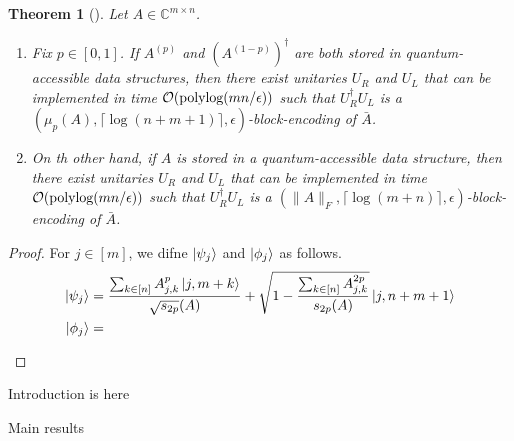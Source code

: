 \documentclass[10pt,twoside,reqno]{amsart} %
\makeatletter
\renewcommand{\section}{\@startsection{section}{1}
   \z@{.7\linespacing\@plus\linespacing}{.5\linespacing}
   {\normalfont\upshape\bfseries\centering}}
\theoremstyle{plain}
\newtheorem{thm}{Theorem}[section]
\theoremstyle{definition}
\makeatother
\begin{document}
\begin{thm}[\cite{chakraborty2019}]
  Let $A\in\mathbb{C}^{m\times n}$.
  \begin{enumerate}
    \item Fix $p\in [0,1]$. If $A^{(p)}$ and $(A^{(1-p)})^{\dagger}$ are both
      stored in quantum-accessible data structures, then there exist
      unitaries $U_R$ and $U_L$ that can be implemented in time
      $\mathcal{O}(\textrm{\normalfont polylog}(mn/\epsilon))$ such that
      $U_R^{\dagger}U_L$ is a $(\mu_p(A), \lceil\log(n+m+1)\rceil, 
      \epsilon)$-block-encoding of $\bar{A}$.
    \item On th other hand, if $A$ is stored in a quantum-accessible data
      structure, then there exist unitaries $U_R$ and $U_L$ that can
      be implemented in time $\mathcal{O}(\textrm{\normalfont polylog}(mn/\epsilon))$ such
      that $U_R^{\dagger}U_L$ is a $(\|A\|_F, \lceil\log(m+n)\rceil,
      \epsilon)$-block-encoding of $\bar{A}$.
  \end{enumerate}
\end{thm}
\begin{proof}
  For $j\in[m]$, we difne $\ket{\psi_j}$ and $\ket{\phi_j}$ as follows.
  \begin{align*}
    \ket{\psi_j} &= \frac{\sum_{k\in[n]}A^p_{j,k}\ket{j,m+k}}{\sqrt{s_{2p}}(A)}+
    \sqrt{1-\frac{\sum_{k\in[n]}A^{2p}_{j,k}}{s_{2p}(A)}}\ket{j,n+m+1}\\
    \ket{\phi_j} &= \frac{}{}
  \end{align*}
\end{proof}


Introduction is here


\section{Main results}

\end{document}

